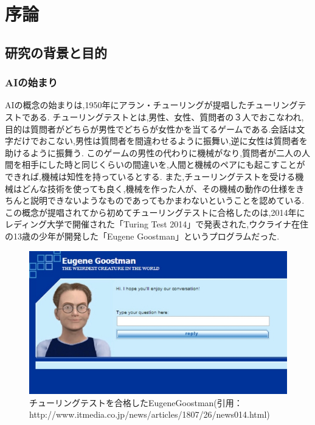 \chapter{序論}
\section{研究の背景と目的}
\subsection{AIの始まり}
AIの概念の始まりは,1950年にアラン・チューリングが提唱したチューリングテストである.\cite{ronbun1}
チューリングテストとは,男性、女性、質問者の３人でおこなわれ,目的は質問者がどちらが男性でどちらが女性かを当てるゲームである.会話は文字だけでおこない,男性は質問者を間違わせるように振舞い,逆に女性は質問者を助けるように振舞う.
このゲームの男性の代わりに機械がなり,質問者が二人の人間を相手にした時と同じくらいの間違いを,人間と機械のペアにも起こすことができれば,機械は知性を持っているとする.
また,チューリングテストを受ける機械はどんな技術を使っても良く,機械を作った人が、その機械の動作の仕様をきちんと説明できないようなものであってもかまわないということを認めている.
この概念が提唱されてから初めてチューリングテストに合格したのは,2014年にレディング大学で開催された「Turing Test 2014」で発表された,ウクライナ在住の13歳の少年が開発した「Eugene Goostman」というプログラムだった.
\begin{figure}[!ht]
    \begin{screen}
    \begin{center}
        \includegraphics[scale=0.6, clip]{./img/Eugene_Goostman.jpg}
        \caption{チューリングテストを合格したEugeneGoostman\newline(引用：http://www.itmedia.co.jp/news/articles/1807/26/news014.html)}
        \label{fig:チューリングテストを合格したEugeneGoostman}
    \end{center}
\end{screen}
\end{figure}
